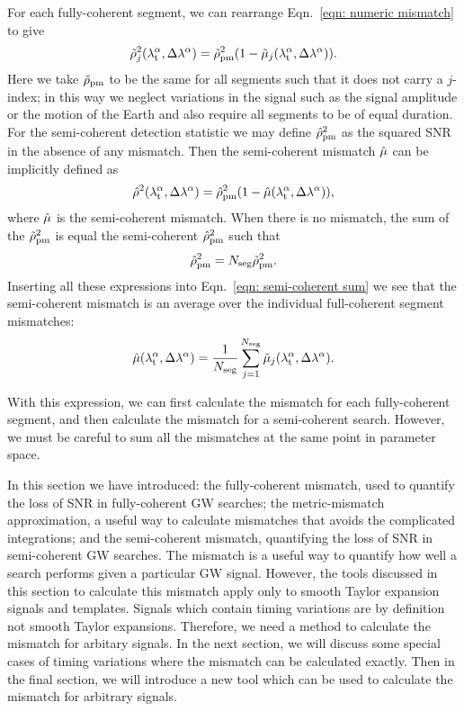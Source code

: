 \documentclass[../full_thesis/full_thesis.tex]{subfiles}
\begin{document}
For each fully-coherent segment, we can rearrange Eqn.~\eqref{eqn: numeric mismatch}
to give
\begin{align}
\tilde{\rho}^{2}_{j}({\lambda}_\textrm{t}^{\alpha}, \Delta\lambda^{\alpha}) =
 \tilde{\rho}^{2}_{\mathrm{pm}}(1 - \tilde{\mu}_{j}({\lambda}_\textrm{t}^{\alpha}, \Delta\lambda^{\alpha})).
\end{align}
Here we take $\tilde{\rho}_{\mathrm{pm}}$ to be the same for all segments such that
it does not carry a $j$-index; in this way we neglect variations
in the signal such as the signal amplitude or the motion of the Earth and also require
all segments to be of equal duration.
For the semi-coherent
detection statistic we may define $\hat{\rho}^{2}_\mathrm{pm}$ as the squared SNR in the
absence of any mismatch. Then the semi-coherent mismatch $\hat{\mu}$ can be implicitly
defined as
\begin{align}
\hat{\rho}^{2}({\lambda}_\textrm{t}^{\alpha}, \Delta\lambda^{\alpha}) =
 \hat{\rho}^{2}_\mathrm{pm}(1 - \hat{\mu}({\lambda}_\textrm{t}^{\alpha}, \Delta\lambda^{\alpha})),
\end{align}
where $\hat{\mu}$ is the semi-coherent mismatch.
When there is no mismatch, the sum of the $\tilde{\rho}^{2}_{\mathrm{pm}}$ is equal the
semi-coherent $\hat{\rho}^{2}_{\mathrm{pm}}$ such that
\begin{align}
\hat{\rho}^{2}_\textrm{pm} = N_{\textrm{seg}}\tilde{\rho}^{2}_\textrm{pm}.
\end{align}
Inserting all these expressions into Eqn.~\eqref{eqn: semi-coherent sum} we see that
the semi-coherent mismatch is an average over the individual full-coherent segment
mismatches:
\begin{align}
\hat{\mu}({\lambda}_\textrm{t}^{\alpha}, \Delta\lambda^{\alpha}) =
 \frac{1}{N_{\textrm{seg}}}\sum_{j=1}^{N_{\textrm{seg}}}\tilde{\mu}_{j}({\lambda}_\textrm{t}^{\alpha}, \Delta\lambda^{\alpha}).
\label{eqn: semi-coherent mismatch}
\end{align}

With this expression, we can first calculate the mismatch for each fully-coherent
segment, and then calculate the mismatch for a semi-coherent search. However, we
must be careful to sum all the mismatches at the same point in parameter space.

In this section we have introduced: the fully-coherent mismatch, used to
quantify the loss of SNR in fully-coherent GW searches; the metric-mismatch
approximation, a useful way to calculate mismatches that avoids the complicated
integrations; and the semi-coherent mismatch, quantifying the loss of SNR in
semi-coherent GW searches. The mismatch is a useful way to quantify how well a
search performs given a particular GW signal. However, the tools discussed in
this section to calculate this mismatch apply only to smooth Taylor expansion
signals and templates. Signals which contain timing variations are by definition
not smooth Taylor expansions. Therefore, we need a method to calculate the
mismatch for arbitary signals. In the next section, we will discuss some
special cases of timing variations where the mismatch can be calculated
exactly. Then in the final section, we will introduce a new tool which can be
used to calculate the mismatch for arbitrary signals.
\end{document}

